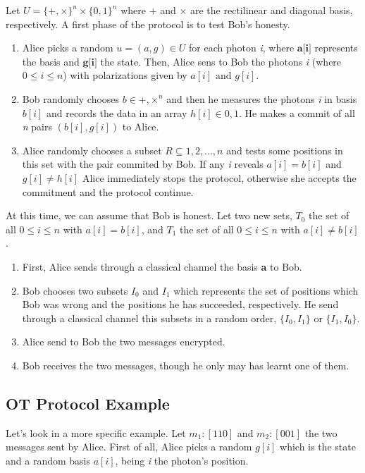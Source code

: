 Let $U=\{+,\times\}^{n} \times \{0,1\}^{n}$ where $+$ and $\times$ are the rectilinear and diagonal basis, respectively.
A first phase of the protocol is to test Bob's honesty.
\begin{enumerate}
	\item{Alice picks a random $u=(a,g) \in U$ for each photon \textit{i}, where $\textbf{a[i]}$ represents the basis and $\textbf{g[i]}$ the state. Then, Alice sens to Bob the photons \textit{i} (where $0\le i \le n$) with polarizations given by $a[i]$ and $g[i]$.}
	\item{Bob randomly chooses $b \in {+, \times}^{n}$ and then he measures the photons \textit{i} in basis $b[i]$ and records the data in an array $h[i] \in {0,1}$. He makes a commit of all \textit{n} pairs $(b[i],g[i])$ to Alice.}
	\item{Alice randomly chooses a subset $R \subseteq {1,2,...,n}$ and tests some positions in this set with  the pair commited by Bob. If any \textit{i} reveals $a[i]=b[i]$ and $g[i] \neq h[i]$ Alice immediately stops the protocol, otherwise she accepts the commitment and the protocol continue.}
\end{enumerate}

At this time, we can assume that Bob is honest. Let two new sets, $T_{0}$ the set of all $0\le i \le n$ with $a[i]=b[i]$, and $T_{1}$ the set of all  $0\le i \le n$ with $a[i]\neq b[i]$.
\begin{enumerate}
	\item{First, Alice sends through a classical channel the basis \textbf{a} to Bob.}
	\item{Bob chooses two subsets $I_{0}$ and $I_{1}$ which represents the set of positions which Bob was wrong and the positions he has succeeded, respectively. He send through a classical channel this subsets in a random order, $\{ I_{0},I_{1} \}$ or $\{ I_{1},I_{0} \}$.}
	\item{Alice send to Bob the two messages encrypted.}
	\item{Bob receives the two messages, though he only may has learnt one of them.}
\end{enumerate}

\subsection{OT Protocol Example}

Let's look in a more specific example. Let $m_{1}: [1 1 0]$ and $m_{2}:[0 0 1]$ the two messages sent by Alice. First of all, Alice picks a random $g[i]$ which is the state and a random basis $a[i]$, being \textit{i} the photon's position.

